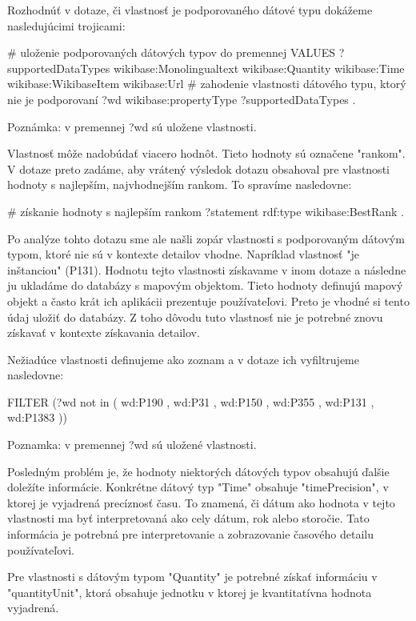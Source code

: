 Rozhodnúť v dotaze, či vlastnosť je podporovaného dátové typu dokážeme nasledujúcimi trojicami:
\begin{code}
      # uloženie podporovaných dátových typov do premennej
      VALUES ?supportedDataTypes {
      wikibase:Monolingualtext
      wikibase:Quantity
      wikibase:Time
      wikibase:WikibaseItem
      wikibase:Url  }
      # zahodenie vlastnosti dátového typu, ktorý nie je podporovaní
      ?wd wikibase:propertyType ?supportedDataTypes .
\end{code}
Poznámka: v premennej ?wd sú uložene vlastnosti.

Vlastnosť môže nadobúdať viacero hodnôt. Tieto hodnoty sú označene "rankom".
V dotaze preto zadáme, aby vrátený výsledok dotazu obsahoval pre vlastnosti hodnoty s najlepším, najvhodnejším rankom. To spravíme nasledovne:
\begin{code}
      # získanie hodnoty s najlepším rankom
      ?statement rdf:type wikibase:BestRank .
\end{code}

Po analýze tohto dotazu sme ale našli zopár vlastnosti s podporovaným dátovým typom, ktoré nie sú v kontexte detailov vhodne.
Napríklad vlastnosť "je inštanciou" (P131). Hodnotu tejto vlastnosti získavame v inom dotaze a následne ju
ukladáme do databázy s mapovým objektom. Tieto hodnoty definujú mapový objekt a často krát ich aplikácii prezentuje používateľovi.
Preto je vhodné si tento údaj uložiť do databázy. Z toho dôvodu tuto vlastnosť nie je potrebné znovu získavať v kontexte získavania detailov.

Nežiadúce vlastnosti definujeme ako zoznam a v dotaze ich vyfiltrujeme nasledovne:
\begin{code}
      FILTER (?wd not in ( wd:P190 , wd:P31 , wd:P150 , wd:P355 , wd:P131 , wd:P1383 ))
\end{code}
Poznamka: v premennej ?wd sú uložené vlastnosti.

Posledným problém je, že hodnoty niektorých dátových typov obsahujú ďalšie doležíte informácie.
Konkrétne dátový typ "Time" obsahuje "timePrecision", v ktorej je vyjadrená precíznosť času. To znamená, či
dátum ako hodnota v tejto vlastnosti ma byť interpretovaná ako cely dátum, rok alebo storočie. Tato informácia je potrebná pre
interpretovanie a zobrazovanie časového detailu používateľovi.

Pre vlastnosti s dátovým typom "Quantity" je potrebné získať informáciu v "quantityUnit", ktorá obsahuje
jednotku v ktorej je kvantitatívna hodnota vyjadrená.

